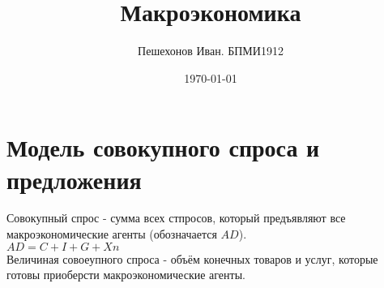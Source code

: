\documentclass[a4paper,11pt]{report}
\title{Макроэкономика}
\author{Пешехонов Иван. БПМИ1912}
\date{\today}
\begin{document}
\section{Модель совокупного спроса и предложения}
Совокупный спрос - сумма всех стпросов, который предъявляют все макроэкономические агенты (обозначается $AD$).\\
$AD = C + I + G + Xn$\\
Величиная совоеупного спроса - объём конечных товаров и услуг, которые готовы приоберсти макроэкономические агенты.\\
\end{document}
